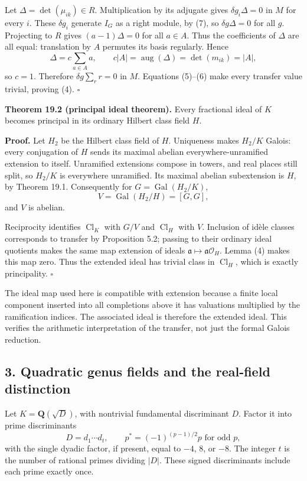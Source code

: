 \documentclass[11pt,a4paper]{article}
\begin{document}
Let \(\Delta=\det(\mu_{ik})\in R\). Multiplication by its adjugate gives
\(\delta g_i\Delta=0\) in \(M\) for every \(i\). These \(\delta g_i\)
generate \(I_G\) as a right module, by (7), so \(\delta g\Delta=0\) for
all \(g\). Projecting to \(R\) gives \((a-1)\Delta=0\) for all
\(a\in A\). Thus the coefficients of \(\Delta\) are all equal:
translation by \(A\) permutes its basis regularly. Hence \[
\Delta=c\sum_{a\in A}a,
\qquad
c|A|=\operatorname{aug}(\Delta)=\det(m_{ik})=|A|,
\] so \(c=1\). Therefore \(\delta g\sum_r r=0\) in \(M\). Equations
(5)--(6) make every transfer value trivial, proving (4). \(\square\)

\textbf{Theorem 19.2 (principal ideal theorem).} Every fractional ideal
of \(K\) becomes principal in its ordinary Hilbert class field \(H\).

\textbf{Proof.} Let \(H_2\) be the Hilbert class field of \(H\).
Uniqueness makes \(H_2/K\) Galois: every conjugation of \(H\) sends its
maximal abelian everywhere-unramified extension to itself. Unramified
extensions compose in towers, and real places still split, so \(H_2/K\)
is everywhere unramified. Its maximal abelian subextension is \(H\), by
Theorem 19.1. Consequently for \(G=\operatorname{Gal}(H_2/K)\), \[
V=\operatorname{Gal}(H_2/H)=[G,G],
\] and \(V\) is abelian.

Reciprocity identifies \(\operatorname{Cl}_K\) with \(G/V\) and
\(\operatorname{Cl}_H\) with \(V\). Inclusion of idèle classes
corresponds to transfer by Proposition 5.2; passing to their ordinary
ideal quotients makes the same map extension of ideals
\(\mathfrak a\mapsto\mathfrak a\mathcal O_H\). Lemma (4) makes this map
zero. Thus the extended ideal has trivial class in
\(\operatorname{Cl}_H\), which is exactly principality. \(\square\)

The ideal map used here is compatible with extension because a finite
local component inserted into all completions above it has valuations
multiplied by the ramification indices. The associated ideal is
therefore the extended ideal. This verifies the arithmetic
interpretation of the transfer, not just the formal Galois reduction.

\subsection{3. Quadratic genus fields and the real-field
distinction}\label{quadratic-genus-fields-and-the-real-field-distinction}

Let \(K=\mathbf Q(\sqrt D)\), with nontrivial fundamental discriminant
\(D\). Factor it into prime discriminants \[
D=d_1\cdots d_t,
\qquad p^*=(-1)^{(p-1)/2}p\text{ for odd }p,
\tag{9}
\] with the single dyadic factor, if present, equal to \(-4\), \(8\), or
\(-8\). The integer \(t\) is the number of rational primes dividing
\(|D|\). These signed discriminants include each prime exactly once.
\end{document}
